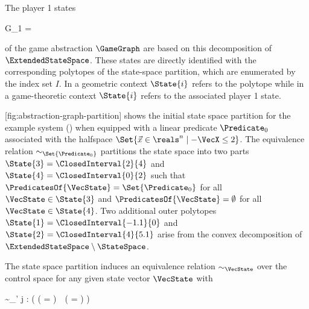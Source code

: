     The player 1 states

    \startformula
        G_1 = 
    \stopformula

    of the game abstraction $\GameGraph$ are based on this decomposition of $\ExtendedStateSpace$.
    These states are directly identified with the corresponding polytopes of the state-space partition, which are enumerated by the index set $I$.
    In a geometric context $\State{i}$ refers to the polytope while in a game-theoretic context $\State{i}$ refers to the associated player 1 state.


    [fig:abstraction-graph-partition] shows the initial state space partition for the example system () when equipped with a linear predicate $\Predicate_0$ associated with the halfspace $ \Set{ \Vec{x} \in \reals^n \mid -\VecX \leq 2 } $.
    The equivalence relation $\sim_{\Set{\Predicate_0}}$ partitions the state space into two parts $\State{3} = \ClosedInterval{2}{4}$ and $\State{4} = \ClosedInterval{0}{2}$ such that $\PredicatesOf{\VecState} = \Set{\Predicate_0}$ for all $\VecState \in \State{3}$ and $\PredicatesOf{\VecState} = \emptyset$ for all $\VecState \in \State{4}$.
    Two additional outer polytopes $\State{1} = \ClosedInterval{-1.1}{0}$ and $\State{2} = \ClosedInterval{4}{5.1}$ arise from the convex decomposition of $\ExtendedStateSpace \setminus \StateSpace$.

    The state space partition induces an equivalence relation $\sim_\VecState$ over the control space for any given state vector $\VecState$ with

    \startformula
        \VecControl \sim_\VecState \VecControl' \;\Longleftrightarrow\;
        \forall j \in \StateIndices: \Big(
            ( \Posterior{\VecState}{\VecControl} \cap {} = \emptyset ) \,\leftrightarrow\,
            (  \cap {} = \emptyset )
        \Big) \EndComma
    \stopformula

